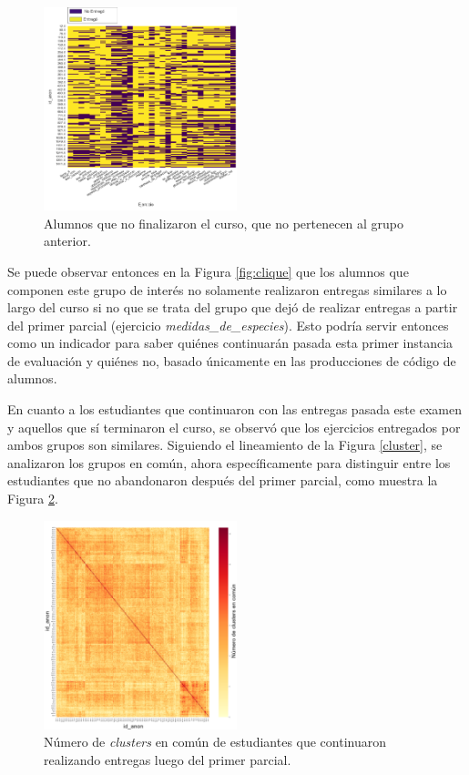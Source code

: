 \documentclass[11pt,a4paper,twoside,openany]{tesis}
\begin{document}
\begin{figure}[H]
\centering
\includegraphics[width=0.5\textwidth]{imagenes/entregas - no-clique13.png}
\caption{Alumnos que no finalizaron el curso, que no pertenecen al grupo anterior.}
\label{fig:noclique}
\end{figure}

Se puede observar entonces en la Figura  \ref{fig:clique} que los alumnos que componen este grupo de interés no solamente realizaron entregas similares a lo largo del curso si no que se trata del grupo que dejó de realizar entregas a partir del primer parcial (ejercicio \emph{medidas\_de\_especies}). Esto podría servir entonces como un indicador para saber quiénes continuarán pasada esta primer instancia de evaluación y quiénes no, basado únicamente en las producciones de código de alumnos.

En cuanto a los estudiantes que continuaron con las entregas pasada este examen y aquellos que sí terminaron el curso, se observó que los ejercicios entregados por ambos grupos son similares. Siguiendo el lineamiento de la Figura \ref {cluster}, se analizaron los grupos en común, ahora específicamente para distinguir entre los estudiantes que no abandonaron después del primer parcial, como muestra la Figura \ref {cluster2}.

\begin{figure}[H]
    \centering
    \includegraphics[width=0.5\textwidth]{imagenes/clusters-no-13.png}
    \caption{Número de  \emph{clusters} en común de estudiantes que continuaron realizando entregas luego del primer parcial.}
    \label{cluster2}
\end{figure}
\end{document}
